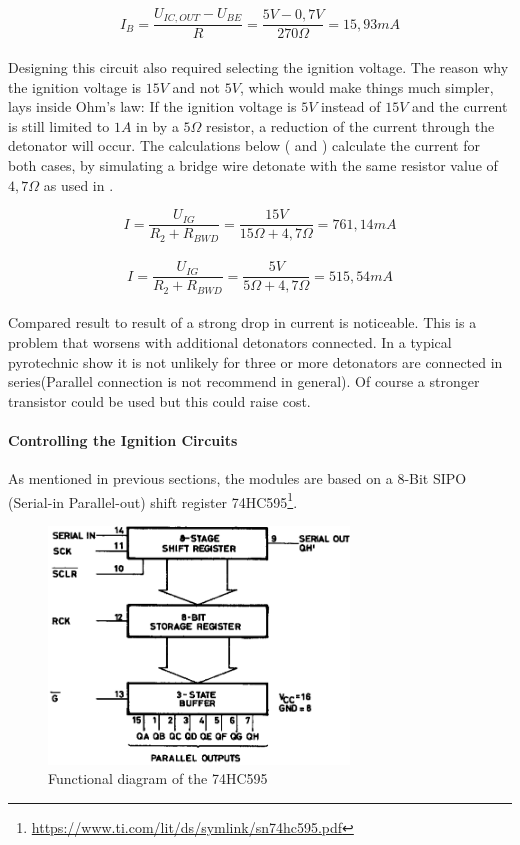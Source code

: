 \begin{equation}
I_B=\frac{U_{IC,OUT}-U_{BE}}{R}=\frac{5V-0,7V}{270\Omega}=15,93mA
\label{eq:base_current}
\end{equation}\\

\noindent Designing this circuit also required selecting the ignition voltage. The reason why the ignition voltage is $15V$ and not $5V$, which would make things much simpler, lays inside Ohm's law: If the ignition voltage is $5V$ instead of $15V$ and the current is still limited to $1A$ in by a $5\Omega$ resistor, a reduction of the current through the detonator will occur. The calculations below ( and ) calculate the current for both cases, by simulating a bridge wire detonate with the same resistor value of $4,7\Omega$ as used in .

\begin{equation}
I=\frac{U_{IG}}{R_2+R_{BWD}}=\frac{15V}{15\Omega+4,7\Omega}= 761,14mA
\label{eq:current_15v}
\end{equation}\\
\begin{equation}
I=\frac{U_{IG}}{R_2+R_{BWD}}=\frac{5V}{5\Omega+4,7\Omega}= 515,54mA
\label{eq:current_5v}
\end{equation}\\

\noindent Compared result  to result of  a strong drop in current is noticeable. This is a problem that worsens with additional detonators connected. In a typical pyrotechnic show it is not unlikely for three or more detonators are connected in series(Parallel connection is not recommend in general). Of course a stronger transistor could be used but this could raise cost.\\

\pagebreak

\paragraph{Controlling the Ignition Circuits}
As mentioned in previous sections, the modules are based on a 8-Bit SIPO (Serial-in Parallel-out) shift register 74HC595\footnote{\url{https://www.ti.com/lit/ds/symlink/sn74hc595.pdf}}. 

\begin{figure}[!ht]
    \centering
    \includegraphics[width=8cm]{./Figures/75hc595.png}
    \caption{Functional diagram of the 74HC595}
    \label{fig:75hc595}     
\end{figure}

